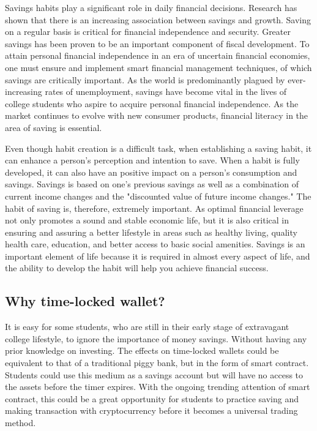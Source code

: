 \documentclass[10pt,twocolumn]{article}
\begin{document}
Savings habits play a significant role in daily financial decisions. Research has shown that there is an increasing association between savings and growth. Saving on a regular basis is critical for financial independence and security. Greater savings has been proven to be an important component of fiscal development. To attain personal financial independence in an era of uncertain financial economies, one must ensure and implement smart financial management techniques, of which savings are critically important. As the world is predominantly plagued by ever-increasing rates of unemployment, savings have become vital in the lives of college students who aspire to acquire personal financial independence. As the market continues to evolve with new consumer products, financial literacy in the area of saving is essential.

Even though habit creation is a difficult task, when establishing a saving habit, it can enhance a person's perception and intention to save. When a habit is fully developed, it can also have an positive impact on a person's consumption and savings. Savings is based on one's previous savings as well as a combination of current income changes and the "discounted value of future income changes." The habit of saving is, therefore, extremely important. As optimal financial leverage not only promotes a sound and stable economic life, but it is also critical in ensuring and assuring a better lifestyle in areas such as healthy living, quality health care, education, and better access to basic social amenities. Savings is an important element of life because it is required in almost every aspect of life, and the ability to develop the habit will help you achieve financial success.

\subsection{Why time-locked wallet?}
	It is easy for some students, who are still in their early stage of extravagant college lifestyle, to ignore the importance of money savings. Without having any prior knowledge on investing. The effects on time-locked wallets could be equivalent to that of a traditional piggy bank, but in the form of smart contract. Students could use this medium as a savings account but will have no access to the assets before the timer expires. With the ongoing trending attention of smart contract, this could be a great opportunity for students to practice saving and making transaction with cryptocurrency before it becomes a universal trading method.
\end{document}
